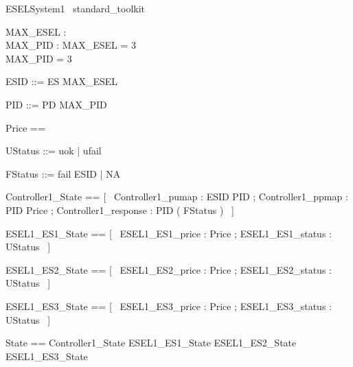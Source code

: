\documentclass{article}
\begin{document}
\begin{zsection}
    \SECTION ESELSystem1 \parents~standard\_toolkit
\end{zsection}

\begin{axdef}
	MAX\_ESEL : \nat \\
 MAX\_PID : \nat 
\where
 MAX\_ESEL = 3 \\
 MAX\_PID = 3
\end{axdef}

\begin{zed}
	ESID ::= ES  \upto MAX\_ESEL \rdata
\end{zed}

\begin{zed}
	PID ::= PD  \upto MAX\_PID \rdata
\end{zed}

\begin{zed}
	Price == \nat
\end{zed}

\begin{zed}
	UStatus ::= uok | ufail
\end{zed}

\begin{zed}
	FStatus ::= fail \ldata ESID \rdata | NA
\end{zed}

\begin{zed}
	Controller1\_State == [~  Controller1\_pumap : ESID \pfun PID ; Controller1\_ppmap : PID \pfun Price ; Controller1\_response : PID \pfun ( \power FStatus )  ~]
\end{zed}

\begin{zed}
	ESEL1\_ES1\_State == [~  ESEL1\_ES1\_price : Price ; ESEL1\_ES1\_status : UStatus  ~]
\end{zed}

\begin{zed}
	ESEL1\_ES2\_State == [~  ESEL1\_ES2\_price : Price ; ESEL1\_ES2\_status : UStatus  ~]
\end{zed}

\begin{zed}
	ESEL1\_ES3\_State == [~  ESEL1\_ES3\_price : Price ; ESEL1\_ES3\_status : UStatus  ~]
\end{zed}

\begin{zed}
	State == Controller1\_State \land ESEL1\_ES1\_State \land ESEL1\_ES2\_State \land ESEL1\_ES3\_State
\end{zed}
\end{document}
